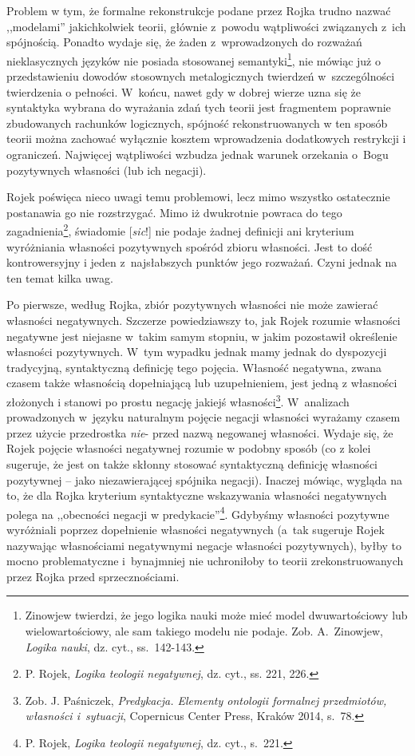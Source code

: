 Problem w tym, że formalne rekonstrukcje podane przez Rojka trudno nazwać
,,modelami'' jakichkolwiek teorii, głównie z~powodu wątpliwości
związanych z~ich spójnością. Ponadto wydaje się, że żaden z~wprowadzonych do
rozważań nieklasycznych języków nie posiada stosowanej semantyki\footnote{Zinowjew twierdzi, że jego
logika nauki może mieć model dwuwartościowy lub wielowartościowy, ale sam takiego modelu nie podaje. Zob.
A.~Zinowjew, \textit{Logika nauki}, dz. cyt., ss.~142-143.},
nie mówiąc już o przedstawieniu dowodów stosownych metalogicznych twierdzeń
w~szczególności twierdzenia o pełności.
W~końcu, nawet gdy w dobrej wierze uzna się że syntaktyka wybrana do wyrażania
zdań tych teorii jest  fragmentem poprawnie zbudowanych rachunków logicznych,
spójność rekonstruowanych w ten sposób teorii można zachować wyłącznie kosztem wprowadzenia dodatkowych restrykcji
i ograniczeń. Najwięcej wątpliwości wzbudza jednak
warunek orzekania o~Bogu pozytywnych
własności (lub ich negacji).




Rojek poświęca nieco uwagi temu problemowi, lecz mimo wszystko ostatecznie
postanawia go nie rozstrzygać.
Mimo iż dwukrotnie powraca do tego zagadnienia\footnote{P. Rojek, \textit{Logika teologii negatywnej}, dz. cyt.,
ss. 221, 226. }, świadomie [\textit{sic}!] nie podaje żadnej definicji
ani kryterium wyróżniania własności pozytywnych spośród zbioru
własności. Jest to dość kontrowersyjny i jeden z~najsłabszych
punktów jego rozważań.
Czyni jednak na ten temat kilka uwag.




Po pierwsze, według Rojka, zbiór pozytywnych własności nie może zawierać
własności negatywnych. Szczerze powiedziawszy to, jak Rojek rozumie własności negatywne jest niejasne
w~takim samym stopniu, w jakim pozostawił określenie własności pozytywnych. W~tym wypadku
jednak mamy jednak do dyspozycji tradycyjną, syntaktyczną definicję tego pojęcia.
Własność negatywna, zwana czasem także własnością dopełniającą lub uzupełnieniem, jest
jedną z własności złożonych i stanowi po prostu negację jakiejś
własności\footnote{Zob. J. Paśniczek, \textit{Predykacja. Elementy ontologii formalnej przedmiotów, własności i~sytuacji}, Copernicus
Center Press, Kraków 2014, s.~78.}. W~analizach prowadzonych
w~języku naturalnym pojęcie negacji własności wyrażamy czasem przez użycie
przedrostka \textit{nie}-  przed nazwą negowanej własności. Wydaje się, że Rojek pojęcie
własności negatywnej rozumie w podobny sposób (co z kolei sugeruje, że jest on także skłonny
stosować syntaktyczną definicję własności pozytywnej -- jako
niezawierającej spójnika negacji).
Inaczej mówiąc, wygląda na to, że dla Rojka kryterium
syntaktyczne wskazywania własności negatywnych polega na ,,obecności negacji w
predykacie''\footnote{P. Rojek, \textit{Logika teologii negatywnej}, dz. cyt., s.~221. }. Gdybyśmy własności pozytywne wyróżniali poprzez dopełnienie własności negatywnych (a~tak sugeruje Rojek nazywając własnościami negatywnymi negacje własności pozytywnych), byłby to mocno problematyczne i~bynajmniej nie uchroniłoby to
teorii zrekonstruowanych przez Rojka przed sprzecznościami.

